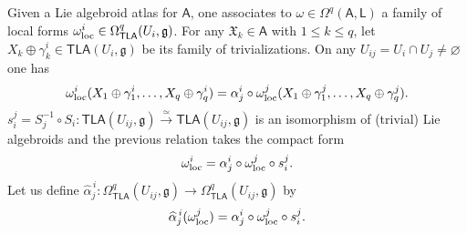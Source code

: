 \documentclass[number]{elsarticle}
\theoremstyle{definition}
\theoremstyle{remark}
\numberwithin{equation}{section}
\begin{document}
Given a Lie algebroid atlas for ${{{{\mathbf{\mathsf{{A}}}}}}}$, one associates to $\omega \in \Omega^q({{{{\mathbf{\mathsf{{A}}}}}}}, {{{{\mathbf{\mathsf{{L}}}}}}})$ a family of local forms $\omega_{{\text{\textup{loc}}}}^i \in \Omega^q_{{{{\mathbf{\mathsf{{TLA}}}}}}}(U_i,{{\mathfrak g}})$. For any ${{\mathfrak X}}_k \in {{{{\mathbf{\mathsf{{A}}}}}}}$ with $1\leq k \leq q$, let $X_k \oplus \gamma^i_k \in {{{{\mathbf{\mathsf{{TLA}}}}}}}(U_i, {{\mathfrak g}})$ be its family of trivializations. On any $U_{ij} = U_i \cap U_j \neq {{\varnothing}}$ one has
\begin{equation*}
\omega_{{\text{\textup{loc}}}}^i(X_1 \oplus \gamma^i_1, \ldots, X_q \oplus \gamma^i_q) = \alpha^{i}_{j} \circ \omega_{{\text{\textup{loc}}}}^j(X_1 \oplus \gamma^j_1, \ldots, X_q \oplus \gamma^j_q).
\end{equation*}
$s_{i}^{j} = S_j^{-1} \circ S_i : {{{{\mathbf{\mathsf{{TLA}}}}}}}(U_{ij}, {{\mathfrak g}}) \xrightarrow{\simeq} {{{{\mathbf{\mathsf{{TLA}}}}}}}(U_{ij}, {{\mathfrak g}})$ is an isomorphism of (trivial) Lie algebroids and the previous relation takes the compact form
\begin{equation}
\label{eq-changelocaltrivializationforms}
\omega_{{\text{\textup{loc}}}}^i = \alpha^{i}_{j} \circ \omega_{{\text{\textup{loc}}}}^j \circ s_{i}^{j}.
\end{equation}
Let us define ${\widehat{\alpha}}_{j}^{\,i} : \Omega^q_{{{{\mathbf{\mathsf{{TLA}}}}}}}(U_{ij},{{\mathfrak g}}) \rightarrow \Omega^q_{{{{\mathbf{\mathsf{{TLA}}}}}}}(U_{ij},{{\mathfrak g}})$ by
\begin{equation}
\label{eq-definitionalphahat}
{\widehat{\alpha}}_{j}^{\,i}(\omega_{{\text{\textup{loc}}}}^j) = \alpha^{i}_{j} \circ \omega_{{\text{\textup{loc}}}}^j \circ s_{i}^{j}.
\end{equation}
\end{document}
